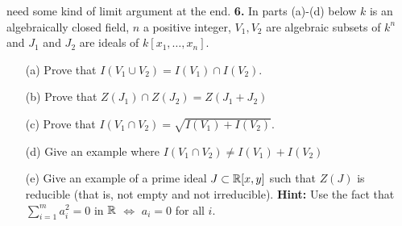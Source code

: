 \documentclass[12pt]{amsart}
\begin{document}
need some kind of limit argument at the end.
\skv
{\bf 6.} In parts (a)-(d) below $k$ is an algebraically closed field, $n$ a positive
integer, $V_1,V_2$ are algebraic subsets of $k^n$ and $J_1$ and $J_2$
are ideals of $k[x_1,\ldots, x_n]$.
\begin{itemize}
\item[(a)] Prove that $I(V_1\cup V_2)=I(V_1)\cap I(V_2)$.
\item[(b)] Prove that $Z(J_1)\cap Z(J_2)=Z(J_1+J_2)$
\item[(c)] Prove that $I(V_1\cap V_2)=\sqrt{I(V_1)+ I(V_2)}$.
\item[(d)] Give an example where
$I(V_1\cap V_2)\neq I(V_1)+ I(V_2)$
\item[(e)] Give an example of a prime ideal $J\subset {\mathbb R}[x,y]$ such that $Z(J)$ is reducible (that is, not empty and not irreducible).
{\bf Hint:} Use the fact that $\sum_{i=1}^m a_i^2=0$ in ${\mathbb R}$ $\iff$ $a_i=0$ for all $i$.
\end{itemize}
\end{document}
